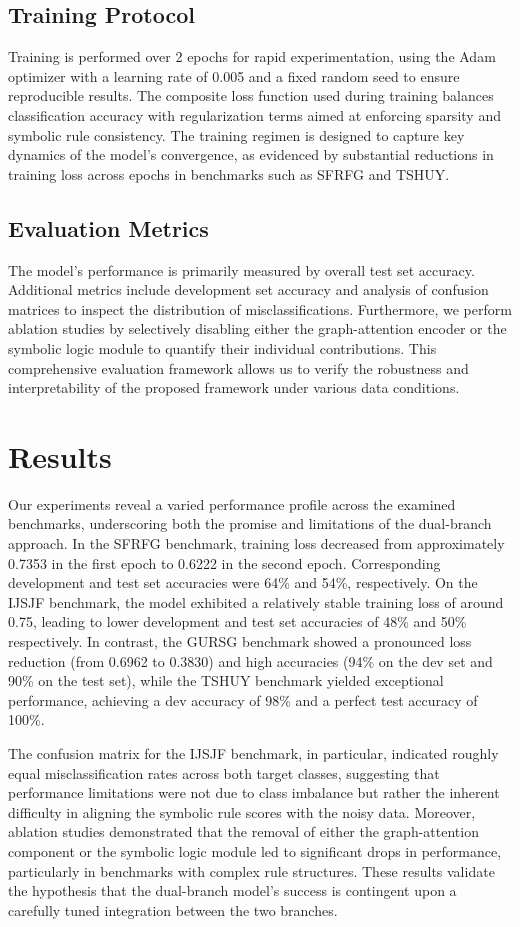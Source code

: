 \documentclass[11pt]{article}
\begin{document}
\subsection{Training Protocol}
Training is performed over 2 epochs for rapid experimentation, using the Adam optimizer with a learning rate of 0.005 and a fixed random seed to ensure reproducible results. The composite loss function used during training balances classification accuracy with regularization terms aimed at enforcing sparsity and symbolic rule consistency. The training regimen is designed to capture key dynamics of the model’s convergence, as evidenced by substantial reductions in training loss across epochs in benchmarks such as SFRFG and TSHUY.

\subsection{Evaluation Metrics}
The model’s performance is primarily measured by overall test set accuracy. Additional metrics include development set accuracy and analysis of confusion matrices to inspect the distribution of misclassifications. Furthermore, we perform ablation studies by selectively disabling either the graph-attention encoder or the symbolic logic module to quantify their individual contributions. This comprehensive evaluation framework allows us to verify the robustness and interpretability of the proposed framework under various data conditions.

\section{Results}
Our experiments reveal a varied performance profile across the examined benchmarks, underscoring both the promise and limitations of the dual-branch approach. In the SFRFG benchmark, training loss decreased from approximately 0.7353 in the first epoch to 0.6222 in the second epoch. Corresponding development and test set accuracies were 64\% and 54\%, respectively. On the IJSJF benchmark, the model exhibited a relatively stable training loss of around 0.75, leading to lower development and test set accuracies of 48\% and 50\% respectively. In contrast, the GURSG benchmark showed a pronounced loss reduction (from 0.6962 to 0.3830) and high accuracies (94\% on the dev set and 90\% on the test set), while the TSHUY benchmark yielded exceptional performance, achieving a dev accuracy of 98\% and a perfect test accuracy of 100\%.

The confusion matrix for the IJSJF benchmark, in particular, indicated roughly equal misclassification rates across both target classes, suggesting that performance limitations were not due to class imbalance but rather the inherent difficulty in aligning the symbolic rule scores with the noisy data. Moreover, ablation studies demonstrated that the removal of either the graph-attention component or the symbolic logic module led to significant drops in performance, particularly in benchmarks with complex rule structures. These results validate the hypothesis that the dual-branch model's success is contingent upon a carefully tuned integration between the two branches.
\end{document}
